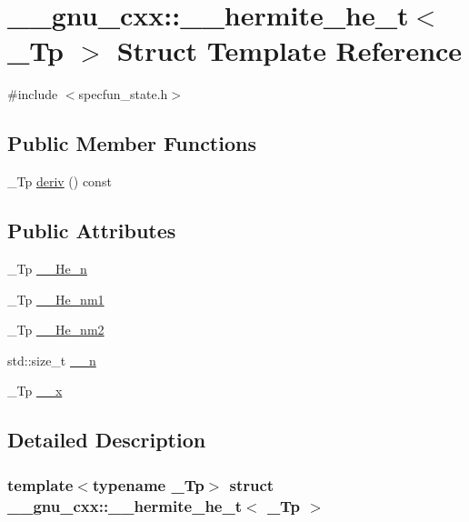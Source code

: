 \hypertarget{struct____gnu__cxx_1_1____hermite__he__t}{}\section{\+\_\+\+\_\+gnu\+\_\+cxx\+:\+:\+\_\+\+\_\+hermite\+\_\+he\+\_\+t$<$ \+\_\+\+Tp $>$ Struct Template Reference}
\label{struct____gnu__cxx_1_1____hermite__he__t}


{\ttfamily \#include $<$specfun\+\_\+state.\+h$>$}

\subsection*{Public Member Functions}
\begin{DoxyCompactItemize}
\item 
\+\_\+\+Tp \hyperlink{struct____gnu__cxx_1_1____hermite__he__t_a19c1df6940043e1b106b8cf70bddd60e}{deriv} () const
\end{DoxyCompactItemize}
\subsection*{Public Attributes}
\begin{DoxyCompactItemize}
\item 
\+\_\+\+Tp \hyperlink{struct____gnu__cxx_1_1____hermite__he__t_ad1a90d0045c4fe567482ebd8cf875842}{\+\_\+\+\_\+\+He\+\_\+n}
\item 
\+\_\+\+Tp \hyperlink{struct____gnu__cxx_1_1____hermite__he__t_a954844caba412a30632beb4263862e44}{\+\_\+\+\_\+\+He\+\_\+nm1}
\item 
\+\_\+\+Tp \hyperlink{struct____gnu__cxx_1_1____hermite__he__t_a1df5a7d99880aae14ee9966bbe1b1179}{\+\_\+\+\_\+\+He\+\_\+nm2}
\item 
std\+::size\+\_\+t \hyperlink{struct____gnu__cxx_1_1____hermite__he__t_aab07d11dda51ca36b1c88e8dd8550046}{\+\_\+\+\_\+n}
\item 
\+\_\+\+Tp \hyperlink{struct____gnu__cxx_1_1____hermite__he__t_a24b66f5153ce3e231976e18b4eccb2a0}{\+\_\+\+\_\+x}
\end{DoxyCompactItemize}


\subsection{Detailed Description}
\subsubsection*{template$<$typename \+\_\+\+Tp$>$\newline
struct \+\_\+\+\_\+gnu\+\_\+cxx\+::\+\_\+\+\_\+hermite\+\_\+he\+\_\+t$<$ \+\_\+\+Tp $>$}

